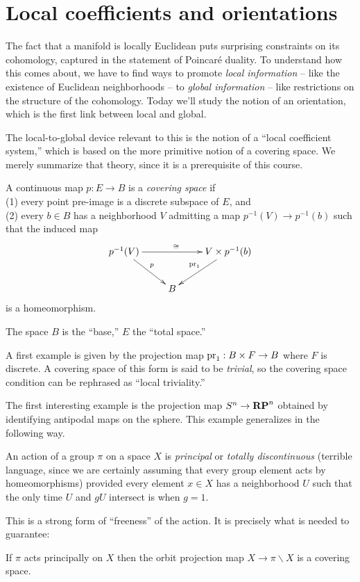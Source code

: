 \section{Local coefficients and orientations}

The fact that a manifold is locally Euclidean puts surprising constraints on
its cohomology, captured in the statement of Poincar\'e duality.
To understand how this comes about, we have to find ways to promote
{\em local information} -- like the existence of Euclidean neighborhoods --
to {\em global information} -- like restrictions on the structure of the
cohomology. Today we'll study the notion of an orientation, which is the first 
link between local and global.

The local-to-global device relevant to this is the notion of a ``local
coefficient system,'' which is based on the more primitive notion of a 
covering space. We merely summarize that theory, since it is a prerequisite 
of this course.

\begin{definition}
A continuous map $p:E\to B$ is a {\em covering space} if \\
(1) every point pre-image is a discrete subspace of $E$, and \\
(2) every $b\in B$ has a neighborhood $V$ admitting a map $p^{-1}(V)\to p^{-1}(b)$ such that the induced map
\[
\xymatrix{
p^{-1}(V) \ar[rr]^\cong \ar[dr]^p && V\times p^{-1}(b) \ar[dl]_{\pr_1} \\
& B
}\]
is a homeomorphism.
\end{definition}
The space $B$ is the ``base,'' $E$ the ``total space.''

\begin{example} 
A first example is given by the projection map $\mathrm{pr}_1:B\times F\to B$ where
$F$ is discrete. A covering space of this form is said to be {\em trivial},
so the covering space condition can be rephrased as ``local triviality.'' 

The first interesting example is the projection map
$S^n\to \mathbf{RP}^n$ obtained by identifying antipodal maps on the sphere. 
This example generalizes in the following way. 
\end{example}
\begin{definition} An action of a group $\pi$ on a space $X$ is
{\em principal} or {\em totally discontinuous} (terrible language,
since we are certainly assuming that every group element acts by
homeomorphisms) provided every element $x\in X$ has a neighborhood
$U$ such that the only time $U$ and $gU$ intersect is when $g=1$. 
\end{definition}
This is a strong form of ``freeness'' of the action. It is precisely
what is needed to guarantee:
\begin{lemma}
If $\pi$ acts principally on $X$ then the orbit projection map
$X\to \pi\backslash X$ is a covering space.
\end{lemma} 

